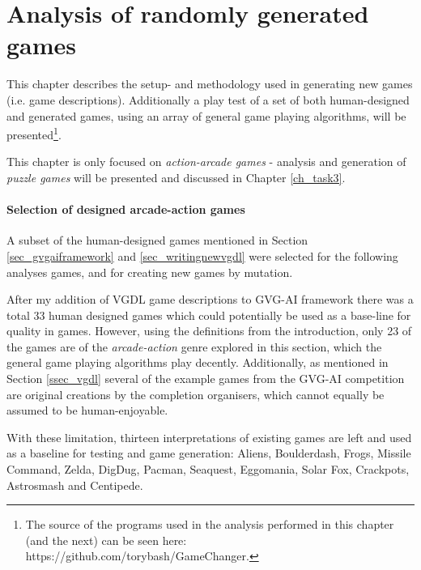 \documentclass[a4paper,titlepage,final]{report}
\begin{document}

\chapter{Analysis of randomly generated games}
\label{ch_task1}
This chapter describes the setup- and methodology used in generating new games (i.e. game descriptions).
Additionally a play test of a set of both human-designed and generated games, using an array of general game playing algorithms, will be presented\footnote{The source of the programs used in the analysis performed in this chapter (and the next) can be seen here: https://github.com/torybash/GameChanger.}.

This chapter is only focused on \textit{action-arcade games} - analysis and generation of \textit{puzzle games} will be presented and discussed in Chapter \ref{ch_task3}.

\subsubsection*{Selection of designed arcade-action games}
A subset of the human-designed games mentioned in Section \ref{sec_gvgaiframework} and \ref{sec_writingnewvgdl} were selected for the following analyses games, and for creating new games by mutation.

After my addition of VGDL game descriptions to GVG-AI framework there was a total 33 human designed games which could potentially be used as a base-line for quality in games. 
However, using the definitions from the introduction, only 23 of the games are of the \textit{arcade-action} genre explored in this section, which the general game playing algorithms play decently.
Additionally, as mentioned in Section \ref{ssec_vgdl} several of the example games from the GVG-AI competition are original creations by the completion organisers, which cannot equally be assumed to be human-enjoyable.

With these limitation, thirteen interpretations of existing games are left and used as a baseline for testing and game generation: Aliens, Boulderdash, Frogs, Missile Command, Zelda, DigDug, Pacman, Seaquest, Eggomania, Solar Fox, Crackpots, Astrosmash and Centipede.
\end{document}
